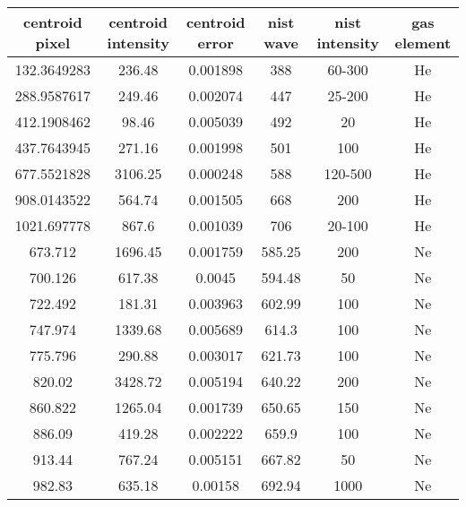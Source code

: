 \documentclass[preprint]{aastex62}
\begin{document}
\begin{table}[H]
    \begin{center}
    \begin{tabular}{|c|c|c|c|c|c|}
    \hline
    centroid pixel & centroid intensity & centroid error & nist wave & nist intensity & gas element \\
    \hline \hline
    132.3649283 & 236.48          & 0.001898        & 388        & 60-300          & He      \\
    288.9587617 & 249.46          & 0.002074        & 447        & 25-200          & He      \\
    412.1908462 & 98.46           & 0.005039        & 492        & 20              & He      \\
    437.7643945 & 271.16          & 0.001998        & 501        & 100             & He      \\
    677.5521828 & 3106.25         & 0.000248        & 588        & 120-500         & He      \\
    908.0143522 & 564.74          & 0.001505        & 668        & 200             & He      \\
    1021.697778 & 867.6           & 0.001039        & 706        & 20-100          & He      \\
    673.712     & 1696.45         & 0.001759        & 585.25     & 200             & Ne      \\
    700.126     & 617.38          & 0.0045          & 594.48     & 50              & Ne      \\
    722.492     & 181.31          & 0.003963        & 602.99     & 100             & Ne      \\
    747.974     & 1339.68         & 0.005689        & 614.3      & 100             & Ne      \\
    775.796     & 290.88          & 0.003017        & 621.73     & 100             & Ne      \\
    820.02      & 3428.72         & 0.005194        & 640.22     & 200             & Ne      \\
    860.822     & 1265.04         & 0.001739        & 650.65     & 150             & Ne      \\
    886.09      & 419.28          & 0.002222        & 659.9      & 100             & Ne      \\
    913.44      & 767.24          & 0.005151        & 667.82     & 50              & Ne      \\
    982.83      & 635.18          & 0.00158         & 692.94     & 1000            & Ne      \\

\end{tabular}
\end{center}
\end{table}
\end{document}
